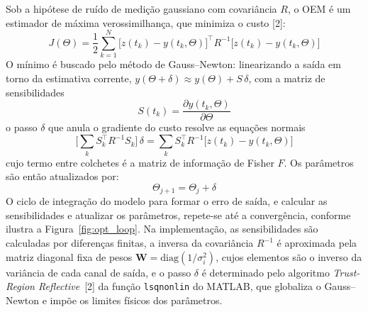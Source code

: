 \documentclass[letterpaper, 10 pt, conference]{ieeeconf}
\begin{document}
Sob a hipótese de ruído de medição gaussiano com covariância $R$, o OEM é um estimador de máxima verossimilhança, que minimiza o custo [2]:
\begin{equation}
J(\Theta) = \frac{1}{2} \sum_{k=1}^{N} \big[z(t_k) - y(t_k,\Theta)\big]^{\top} R^{-1} \big[z(t_k) - y(t_k,\Theta)\big]
\label{eq:oem-cost}
\end{equation}
O mínimo é buscado pelo método de Gauss--Newton: linearizando a saída em torno da estimativa corrente, $y(\Theta + \delta) \approx y(\Theta) + S\,\delta$, com a matriz de sensibilidades
\begin{equation}
S(t_k) = \frac{\partial y(t_k, \Theta)}{\partial \Theta}
\label{eq:sens}
\end{equation}
o passo $\delta$ que anula o gradiente do custo resolve as equações normais
\begin{equation}
\Big[\textstyle\sum_{k} S_k^{\top} R^{-1} S_k\Big]\, \delta = \textstyle\sum_{k} S_k^{\top} R^{-1}\big[z(t_k) - y(t_k,\Theta)\big]
\label{eq:gauss-newton}
\end{equation}
cujo termo entre colchetes é a matriz de informação de Fisher $F$. Os parâmetros são então atualizados por:
\begin{equation}
\Theta_{j+1} = \Theta_{j} + \delta
\label{eq:update}
\end{equation}
O ciclo de integração do modelo para formar o erro de saída, e calcular as sensibilidades e atualizar os parâmetros, repete-se até a convergência, conforme ilustra a Figura~\ref{fig:opt_loop}. Na implementação, as sensibilidades são calculadas por diferenças finitas, a inversa da covariância $R^{-1}$ é aproximada pela matriz diagonal fixa de pesos $\mathbf{W} = \mathrm{diag}(1/\sigma_i^2)$, cujos elementos são o inverso da variância de cada canal de saída, e o passo $\delta$ é determinado pelo algoritmo \textit{Trust-Region Reflective}~[2] da função \texttt{lsqnonlin} do MATLAB, que globaliza o Gauss--Newton e impõe os limites físicos dos parâmetros.
\end{document}
